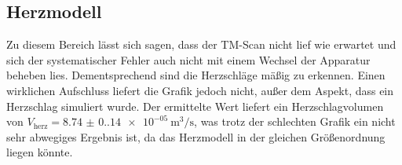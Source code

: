 \subsection{Herzmodell}
Zu diesem Bereich lässt sich sagen, dass der TM-Scan nicht lief wie erwartet und 
sich der systematischer Fehler auch nicht mit einem Wechsel der Apparatur 
beheben lies. Dementsprechend sind die Herzschläge mäßig zu erkennen. Einen 
wirklichen Aufschluss liefert die Grafik jedoch nicht, außer dem Aspekt, dass 
ein Herzschlag simuliert wurde. Der ermittelte Wert liefert ein Herzschlagvolumen
von $V_\text{herz} = \qty{8.74(0.14)e-05}{\meter^3\per\second}$, was trotz der 
schlechten Grafik ein nicht sehr abwegiges Ergebnis ist, da das Herzmodell 
in der gleichen Größenordnung liegen könnte.